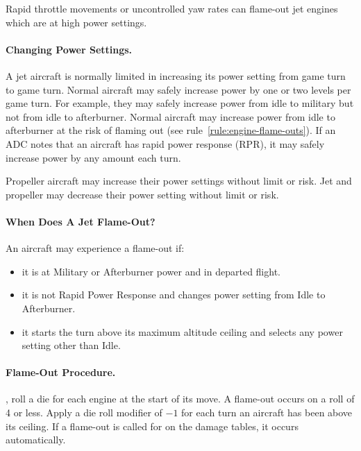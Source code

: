\begin{advancedrules}
Rapid throttle movements or uncontrolled yaw rates can flame-out jet engines which are at high power settings.

\paragraph{Changing Power Settings.}\label{rule:rapid-power-response} A jet aircraft is normally limited in increasing its power setting from game turn to game turn. Normal aircraft may safely increase power by one or two levels per game turn. For example, they may safely increase power from idle to military but not from idle to afterburner. Normal aircraft may increase power from idle to afterburner at the risk of flaming out (see rule~\ref{rule:engine-flame-outs}). If an ADC notes that an aircraft has rapid power response (RPR), it may safely increase power by any amount each turn. 

Propeller aircraft may increase their power settings without limit or risk. Jet and propeller may decrease their power setting without limit or risk. 

\paragraph{When Does A Jet Flame-Out?} An aircraft may experience a flame-out if:

\begin{itemize}

    \item it is at Military or Afterburner power and in departed flight.

    \item it is not Rapid Power Response and changes power setting from Idle to Afterburner.

    \item it starts the turn above its maximum altitude ceiling and selects any power setting other than Idle.

\end{itemize}


\paragraph{Flame-Out Procedure.} 
, roll a die for each engine at the start of its move. A flame-out occurs on a roll of 4 or less. Apply a die roll modifier of $-1$ for each turn an aircraft has been above its ceiling. If a flame-out is called for on the damage tables, it occurs automatically.


\end{advancedrules}
